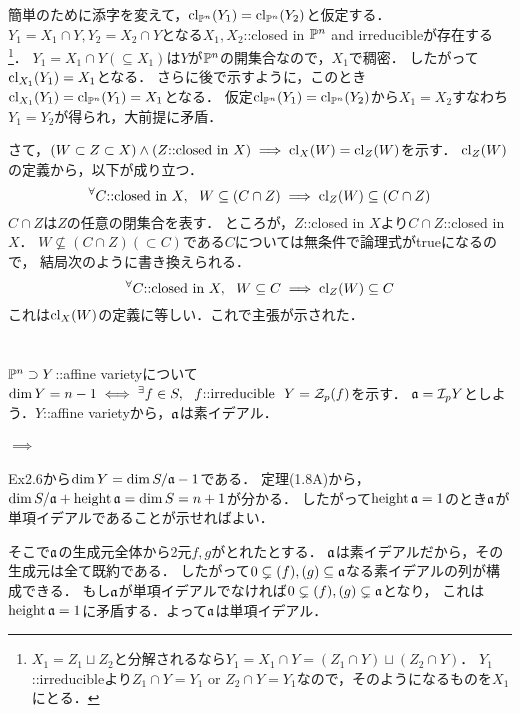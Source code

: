 \documentclass[a4paper]{jsarticle}
\begin{document}
    簡単のために添字を変えて，$\operatorname{cl}_{\mathbb{P}^n}(Y_1)=\operatorname{cl}_{\mathbb{P}^n}(Y_2)$と仮定する．
    $Y_1=X_1 \cap Y, Y_2=X_2 \cap Y$となる$X_1, X_2$::closed in $\mathbb{P}^n$ and irreducibleが存在する
    \footnote{$X_1=Z_1 \sqcup Z_2$と分解されるなら$Y_1=X_1 \cap Y=(Z_1 \cap Y) \sqcup (Z_2 \cap Y)$．
    $Y_1$::irreducibleより$Z_1 \cap Y=Y_1$ or $Z_2 \cap Y=Y_1$なので，そのようになるものを$X_1$にとる．}．
    $Y_1=X_1 \cap Y( \subseteq X_1)$は$Y$が$\mathbb{P}^n$の開集合なので，$X_1$で稠密．
    したがって$\operatorname{cl}_{X_1}(Y_1)=X_1$となる．
    さらに後で示すように，このとき$\operatorname{cl}_{X_1}(Y_1)=\operatorname{cl}_{\mathbb{P}^n}(Y_1)=X_1$となる．
    仮定$\operatorname{cl}_{\mathbb{P}^n}(Y_1)=\operatorname{cl}_{\mathbb{P}^n}(Y_2)$から$X_1=X_2$すなわち$Y_1=Y_2$が得られ，大前提に矛盾．

    さて，$(W \subset Z \subset X) \land (Z\mbox{::closed in }X) \implies \operatorname{cl}_{X}(W)=\operatorname{cl}_{Z}(W)$を示す．
    $\operatorname{cl}_{Z}(W)$の定義から，以下が成り立つ．
    \[ {}^{\forall} C\mbox{::closed in }X,~~ W \subseteq (C \cap Z) \implies \operatorname{cl}_{Z}(W) \subseteq (C \cap Z) \]
    $C \cap Z$は$Z$の任意の閉集合を表す．
    ところが，$Z$::closed in $X$より$C \cap Z$::closed in $X$．
    $W \not \subseteq (C \cap Z)( \subset C)$である$C$については無条件で論理式がtrueになるので，
    結局次のように書き換えられる．
    \[ {}^{\forall} C\mbox{::closed in }X,~~ W \subseteq C \implies \operatorname{cl}_{Z}(W) \subseteq C \]
    これは$\operatorname{cl}_{X}(W)$の定義に等しい．これで主張が示された．

\section{ } %
$\mathbb{P}^n \supset Y$::affine varietyについて$\dim Y=n-1 \iff {}^{\exists} f \in S,~~ f \mbox{::irreducible}~~ Y=\mathcal{Z}_p(f)$を示す．
    $\mathfrak{a}=\mathcal{I}_p{Y}$としよう．$Y$::affine varietyから，$\mathfrak{a}$は素イデアル．
    \paragraph{$\implies$}
    Ex2.6から$\dim Y=\dim S/\mathfrak{a}-1$である．
    定理(1.8A)から，$\dim S/\mathfrak{a}+\operatorname{height} \mathfrak{a}=\dim S=n+1$が分かる．
    したがって$\operatorname{height} \mathfrak{a}=1$のとき$\mathfrak{a}$が単項イデアルであることが示せればよい．

    そこで$\mathfrak{a}$の生成元全体から2元$f,g$がとれたとする．
    $\mathfrak{a}$は素イデアルだから，その生成元は全て既約である．
    したがって$0 \subsetneq (f),(g) \subseteq \mathfrak{a}$なる素イデアルの列が構成できる．
    もし$\mathfrak{a}$が単項イデアルでなければ$0 \subsetneq (f),(g) \subsetneq \mathfrak{a}$となり，
    これは$\operatorname{height} \mathfrak{a}=1$に矛盾する．よって$\mathfrak{a}$は単項イデアル．
\end{document}
